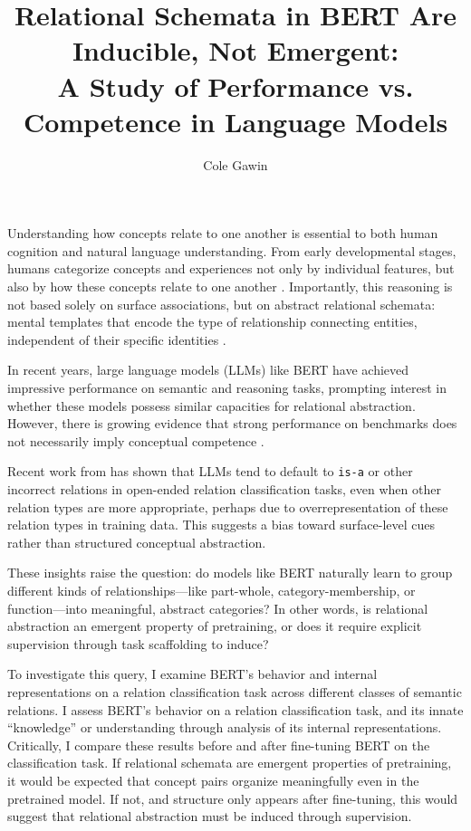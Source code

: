 \documentclass[stu,floatsintext]{apa7}
\title{Relational Schemata in BERT Are Inducible, Not Emergent:\\A Study of Performance vs. Competence in Language Models}
\author{Cole Gawin}
\affiliation{University of Southern California}
\begin{document}
\maketitle

Understanding how concepts relate to one another is essential to both human cognition and natural language understanding. From early developmental stages, humans categorize concepts and experiences not only by individual features, but also by how these concepts relate to one another \parencite{Gentner1983}. Importantly, this reasoning is not based solely on surface associations, but on abstract relational schemata: mental templates that encode the type of relationship connecting entities, independent of their specific identities \parencite{gentner2005relational}.

In recent years, large language models (LLMs) like BERT \parencite{devlin-etal-2019-bert} have achieved impressive performance on semantic and reasoning tasks, prompting interest in whether these models possess similar capacities for relational abstraction. However, there is growing evidence that strong performance on benchmarks does not necessarily imply conceptual competence \parencite{Bender2020, McCoy2019, Niven2019}.

Recent work from \textcite{Gawin2025} has shown that LLMs tend to default to \texttt{is-a} or other incorrect relations in open-ended relation classification tasks, even when other relation types are more appropriate, perhaps due to overrepresentation of these relation types in training data. This suggests a bias toward surface-level cues rather than structured conceptual abstraction.

These insights raise the question: do models like BERT naturally learn to group different kinds of relationships—like part-whole, category-membership, or function—into meaningful, abstract categories? In other words, is relational abstraction an emergent property of pretraining, or does it require explicit supervision through task scaffolding to induce?

To investigate this query, I examine BERT's behavior and internal representations on a relation classification task across different classes of semantic relations. I assess BERT's behavior on a relation classification task, and its innate ``knowledge'' or understanding through analysis of its internal representations. Critically, I compare these results before and after fine-tuning BERT on the classification task. If relational schemata are emergent properties of pretraining, it would be expected that concept pairs organize meaningfully even in the pretrained model. If not, and structure only appears after fine-tuning, this would suggest that relational abstraction must be induced through supervision.
\end{document}
